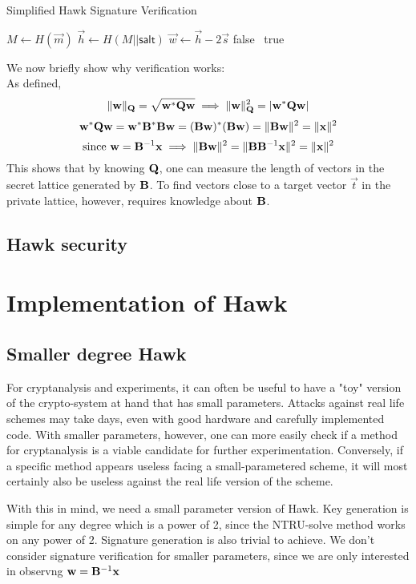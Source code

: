 \begin{algorithm}[H]
    \caption{Simplified Hawk Signature Verification}\label{simple_hawkver}
\begin{algorithmic}[1]
    \State $M \gets H(\vec{m})$ 
    \State $\vec{h} \gets H(M || \mathsf{salt})$
    \State $\vec{w} \gets \vec{h} - 2\vec{s}$
    \State \Return false
    \Else \ \Return true
    \EndIf
\end{algorithmic}
\end{algorithm}

We now briefly show why verification works: \\
As defined, 
\[
    \lVert \mathbf{w} \rVert_{\mathbf{Q}} = \sqrt{\mathbf{w}^* \mathbf{Q} \mathbf{w}} \implies \lVert \mathbf{w} \rVert_{\mathbf{Q}} ^2 = |\mathbf{w}^* \mathbf{Q} \mathbf{w}| \\
\]
\[
    \mathbf{w}^* \mathbf{Q} \mathbf{w} = \mathbf{w}^* \mathbf{B}^* \mathbf{B} \mathbf{w} = (\mathbf{B} \mathbf{w})^* (\mathbf{B} \mathbf{w}) = \lVert \mathbf{B} \mathbf{w} \rVert ^2
    = \lVert \mathbf{x} \rVert ^2
\]
\[
    \text{since } \mathbf{w} = \mathbf{B}^{-1} \mathbf{x} \implies \lVert \mathbf{B} \mathbf{w} \rVert ^2 = \lVert \mathbf{B} \mathbf{B}^{-1} \mathbf{x} \rVert ^2 = \lVert \mathbf{x} \rVert ^2
\]
This shows that by knowing $\mathbf{Q}$, one can measure the length of vectors in the secret lattice generated by $\mathbf{B}$. To find vectors close to a target vector $\vec{t}$ 
in the private lattice, however, requires knowledge about $\mathbf{B}$.
\subsection{Hawk security}
\section{Implementation of Hawk}
\subsection{Smaller degree Hawk}
For cryptanalysis and experiments, it can often be useful to have a "toy" version of the crypto-system at hand that has small parameters. Attacks against real life schemes may take days, even with good hardware and carefully implemented code. 
With smaller parameters, however, one can more easily check if a method for cryptanalysis is a viable candidate for further experimentation. Conversely, if a specific method appears useless facing a small-parametered scheme, it will most certainly
also be useless against the real life version of the scheme.

With this in mind, we need a small parameter version of Hawk.
Key generation is simple for any degree which is a power of 2, since the NTRU-solve method works on any power of 2.
Signature generation is also trivial to achieve. We don't consider signature verification for smaller parameters, since we are only interested in observng $\mathbf{w} = \mathbf{B}^{-1} \mathbf{x}$
